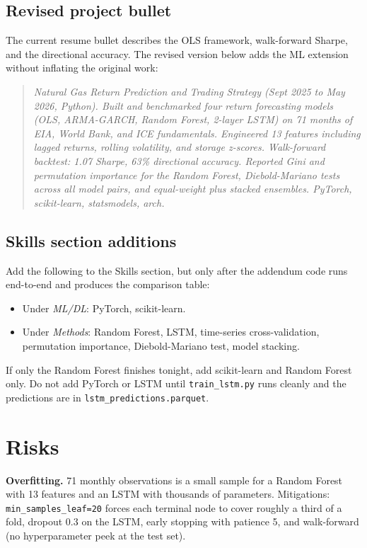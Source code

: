 \documentclass[11pt,letterpaper]{article}
\begin{document}
\subsection{Revised project bullet}

The current resume bullet describes the OLS framework, walk-forward Sharpe, and the directional accuracy. The revised version below adds the ML extension without inflating the original work:

\begin{quote}\small\itshape
Natural Gas Return Prediction and Trading Strategy (Sept 2025 to May 2026, Python).
Built and benchmarked four return forecasting models (OLS, ARMA-GARCH, Random Forest, 2-layer LSTM) on 71 months of EIA, World Bank, and ICE fundamentals. Engineered 13 features including lagged returns, rolling volatility, and storage z-scores. Walk-forward backtest: 1.07 Sharpe, 63\% directional accuracy. Reported Gini and permutation importance for the Random Forest, Diebold-Mariano tests across all model pairs, and equal-weight plus stacked ensembles. PyTorch, scikit-learn, statsmodels, arch.
\end{quote}

\subsection{Skills section additions}

Add the following to the Skills section, but only after the addendum code runs end-to-end and produces the comparison table:

\begin{itemize}[leftmargin=*,nosep]
  \item Under \emph{ML/DL}: PyTorch, scikit-learn.
  \item Under \emph{Methods}: Random Forest, LSTM, time-series cross-validation, permutation importance, Diebold-Mariano test, model stacking.
\end{itemize}

If only the Random Forest finishes tonight, add scikit-learn and Random Forest only. Do not add PyTorch or LSTM until \texttt{train\_lstm.py} runs cleanly and the predictions are in \texttt{lstm\_predictions.parquet}.

\section{Risks}

\textbf{Overfitting.} 71 monthly observations is a small sample for a Random Forest with 13 features and an LSTM with thousands of parameters. Mitigations: \texttt{min\_samples\_leaf=20} forces each terminal node to cover roughly a third of a fold, dropout 0.3 on the LSTM, early stopping with patience 5, and walk-forward (no hyperparameter peek at the test set).
\end{document}

